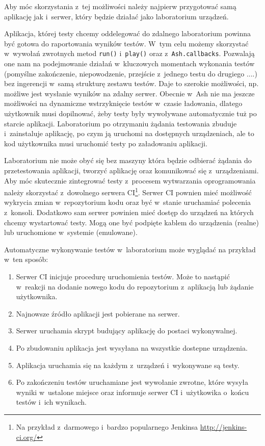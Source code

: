 \documentclass[brudnopis]{xmgr}
\begin{document}
Aby móc skorzystania z~tej możliwości należy najpierw przygotować samą aplikację jak i~serwer, który będzie działać jako laboratorium urządzeń. 

Aplikacja, której testy chcemy oddelegować do zdalnego laboratorium powinna być gotowa do raportowania wyników testów. W~tym celu możemy skorzystać w~wywołań zwrotnych metod \texttt{run()} i~\texttt{play()} oraz z~\texttt{Ash.callbacks}. Pozwalają one nam na podejmowanie działań w~kluczowych momentach wykonania testów (pomyślne zakończenie, niepowodzenie, przejście z~jednego testu do drugiego ....) bez ingerencji w~samą strukturę zestawu testów. Daje to szerokie możliwości, np. możliwe jest wysłanie wyników na zdalny serwer. Obecnie w~Ash nie ma jeszcze możliwości na dynamiczne wstrzyknięcie testów w~czasie ładowania, dlatego użytkownik musi dopilnować, żeby testy były wywoływane automatycznie tuż po starcie aplikacji. Laboratorium po otrzymaniu żądania testowania zbuduje i~zainstaluje aplikację, po czym ją uruchomi na dostępnych urządzeniach, ale to kod użytkownika musi uruchomić testy po załadowaniu aplikacji.

Laboratorium nie może obyć się bez maszyny która będzie odbierać żądania do przetestowania aplikacji, tworzyć aplikację oraz komunikować się z~urządzeniami. Aby móc skutecznie zintegrować testy z~procesem wytwarzania oprogramowania należy skorzystać z~dowolnego serwera CI\footnote{ Na przykład z~darmowego i~bardzo popularnego Jenkinsa \url{ http://jenkins-ci.org/} }. Serwer CI pownien mieć możliwość wykrycia zmian w~repozytorium kodu oraz być w~stanie uruchamiać polecenia z~konsoli. Dodatkowo sam serwer powinien mieć dostęp do urządzeń na których chcemy wystartować testy. Mogą one być podpięte kablem do urządzenia (realne) lub uruchomione w~systemie (emulowane). 

Automatyczne wykonywanie testów w~laboratorium może wyglądać na przykład w~ten sposób:

\begin{enumerate}
  \item Serwer CI inicjuje procedurę uruchomienia testów. Może to nastąpić w~reakcji na dodanie nowego kodu do repozytorium z~aplikacją lub żądanie użytkownika.
  \item Najnowsze źródło aplikacji jest pobierane na serwer.
  \item Serwer uruchamia skrypt budujący aplikację do postaci wykonywalnej.
  \item Po zbudowaniu aplikacja jest wysyłana na wszystkie dostepne urządzenia.
  \item Aplikacja uruchamia się na każdym z~urządzeń i~wykonywane są testy.
  \item Po zakończeniu testów uruchamiane jest wywołanie zwrotne, które wysyła wyniki w~ustalone miejsce oraz informuje serwer CI i~użytkowika o~końcu testów i~ich wynikach.
\end{enumerate}
\end{document}
